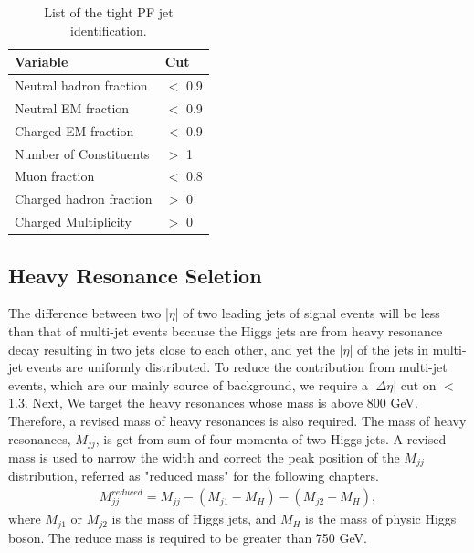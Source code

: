 \begin{table}[h!]
  \begin{center}
    \begin{tabular}{ll}
    Variable & Cut \\
    \hline
    Neutral hadron fraction & $<$ 0.9 \\
    Neutral EM fraction & $<$ 0.9 \\
    Charged EM fraction & $<$ 0.9 \\
    Number of Constituents & $>$ 1 \\
    Muon fraction & $<$ 0.8 \\
    Charged hadron fraction & $>$ 0 \\
    Charged Multiplicity & $>$ 0 \\
	\hline
    \end{tabular}
  \end{center}

  \caption{List of the tight PF jet identification.}
  \end{table}

\subsection{Heavy Resonance Seletion} 
The difference between two |$\eta $| of two leading jets of signal events will be less than that of multi-jet events because the Higgs jets are from heavy resonance decay resulting in two jets close to each other, and yet the |$\eta $| of the jets in multi-jet events are uniformly distributed. To reduce the contribution from multi-jet events, which are our mainly source of background, we require a |$\Delta \eta $| cut on $<$ 1.3. 
Next, We target the heavy resonances whose mass is above 800 GeV. Therefore, a revised mass of heavy resonances is also required. The mass of heavy resonances, $M_{jj}$, is get from sum of four momenta of two Higgs jets. A revised mass is used to narrow the width and correct the peak position of the $M_{jj}$ distribution, referred as "reduced mass" for the following chapters.
\begin{equation} \label{eq4}
\begin{split}
M^{reduced}_{jj} = M_{jj} - (M_{j1} - M_{H} ) - (M_{j2} - M_{H} ), 
\end{split}
\end{equation}
where $M_{j1}$ or $M_{j2}$ is the mass of Higgs jets, and $M_{H}$ is the mass of physic Higgs boson. The reduce mass is required to be greater than 750 GeV. 

